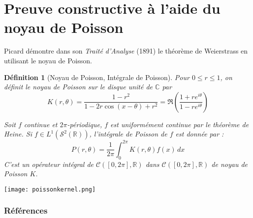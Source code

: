 \documentclass[
	11pt, %
]{beamer}
\newtheorem{defi}[subsubsection]{Définition}
\begin{document}
\section{Preuve constructive à l'aide du noyau de Poisson}
\begin{frame}

Picard démontre dans son \textit{Traité d'Analyse} (1891) le théorème de Weierstrass en utilisant le noyau de Poisson. 
\begin{defi}[Noyau de Poisson, Intégrale de Poisson]
	Pour \( 0 \leq r \leq 1 \), on définit le noyau de Poisson sur le disque unité de \( \mathbb{C} \) par
\begin{equation*}
	K(r,\theta) = \frac{1 - r^{2}}{1-2r\cos(x-\theta)+r^{2}} = \Re(\frac{1 + re^{i\theta}}{1 - re^{i\theta}})
\end{equation*}

Soit \( f \) continue et \( 2\pi\)-périodique, \( f \) est uniformément continue par le théorème de Heine. Si \( f \in L^{1}(\mathcal{S}^{2}(\mathbb{R})) \), l'intégrale de Poisson de \( f \) est donnée par :
\begin{equation*}
	P(r,\theta) = \frac{1}{2\pi} \int_0^{2\pi} 
	K(r,\theta) f(x) \, dx
\end{equation*}
C'est un opérateur intégral de \( \mathcal{C}([0,2\pi],\mathbb{R}) \) dans \( \mathcal{C}([0,2\pi],\mathbb{R}) \) de noyau de Poisson \( K \). \nocite{pinkus2000approximation}

	\end{defi}
\end{frame}

\begin{frame}
	\center\texttt{[image: poissonkernel.png]}
\end{frame}



\begin{frame}[allowframebreaks] %
	\frametitle{Références}
	
	{\footnotesize
	\printbibliography}

\end{frame}
\end{document}
